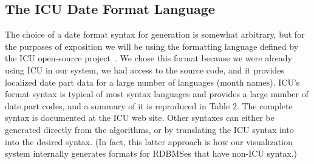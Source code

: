 \subsection{The ICU Date Format Language}

The choice of a date format syntax for generation is somewhat arbitrary, but for the purposes of exposition we will be using the formatting language defined by the ICU open-source project~\cite{ICU}. We chose this format because we were already using ICU in our system, we had access to the source code, and it provides localized date part data for a large number of languages (\eg month names). ICU's format syntax is typical of most syntax languages and provides a large number of date part codes, and a summary of it is reproduced in Table 2. The complete syntax is documented at the ICU web site.  Other syntaxes can either be generated directly from the algorithms, or by translating the ICU syntax into into the desired syntax. (In fact, this latter approach is how our visualization system internally generates formats for RDBMSes that have non-ICU syntax.)

